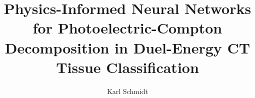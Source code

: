 \documentclass[sigconf]{acmart}
\begin{document}
\title{Physics-Informed Neural Networks for Photoelectric-Compton Decomposition in Duel-Energy CT Tissue Classification}

\author{Karl Schmidt}

\acmConference[ ]{ }{ }{}
\acmBooktitle{}
\renewcommand\footnotetextcopyrightpermission[1]{}



\maketitle










\end{document}
